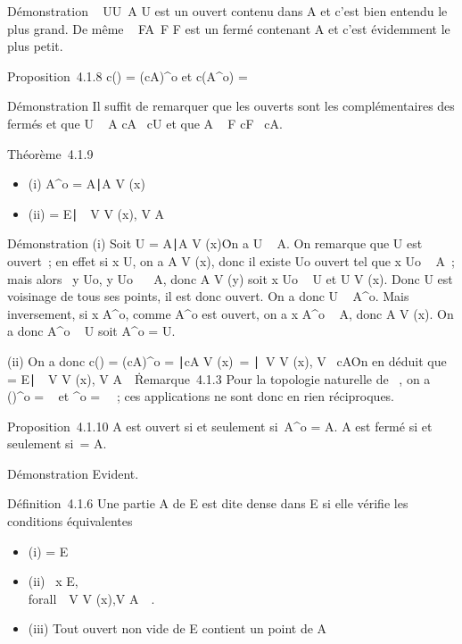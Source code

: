 Démonstration \⋃ ~
 U\textouvert \atop U\subset~A U
est un ouvert contenu dans A et c'est bien entendu le plus grand. De
même \⋂  ~
F \atop A\subset~F F est un
fermé contenant A et c'est évidemment le plus petit.

Proposition~4.1.8 c(\overlineA) = (cA)^o
et c(A^o) = \overlinecA

Démonstration Il suffit de remarquer que les ouverts sont les
complémentaires des fermés et que U \subset~ A \Leftrightarrow cA
\subset~cU et que A \subset~ F \Leftrightarrow cF \subset~cA.

Théorème~4.1.9

\begin{itemize}
\itemsep1pt\parskip0pt
\item
  (i) A^o = \x \in
  A∣A \in V (x)\
\item
  (ii) \overlineA = \x \in
  E∣\forall~~V \in V (x), V \bigcap
  A\neq~\varnothing~\
\end{itemize}

Démonstration (i) Soit U = \x \in
A∣A \in V (x)\. On a U \subset~ A. On
remarque que U est ouvert~; en effet si x \in U, on a A \in V (x), donc il
existe Uo ouvert tel que x \in Uo \subset~ A~; mais alors
\forall~y \in Uo, y \in Uo~ \subset~ A, donc
A \in V (y) soit x \in Uo \subset~ U et U \in V (x). Donc U est voisinage
de tous ses points, il est donc ouvert. On a donc U \subset~ A^o.
Mais inversement, si x \in A^o, comme A^o est
ouvert, on a x \in A^o \subset~ A, donc A \in V (x). On a donc
A^o \subset~ U soit A^o = U.

(ii) On a donc c(\overlineA) = (cA)^o =
\x∣cA \in V
(x)\ =
\x∣\exists~V
\in V (x), V \subset~cA\. On en déduit que
\overlineA = \x \in
E∣\forall~~V \in V (x), V \bigcap
A\neq~\varnothing~\.

Remarque~4.1.3 Pour la topologie naturelle de ~, on a
()^o = ~ et
\overlineℚ^o = \varnothing~~; ces applications ne
sont donc en rien réciproques.

Proposition~4.1.10 A est ouvert si et seulement si~A^o = A. A
est fermé si et seulement si~\overlineA = A.

Démonstration Evident.

Définition~4.1.6 Une partie A de E est dite dense dans E si elle vérifie
les conditions équivalentes

\begin{itemize}
\itemsep1pt\parskip0pt
\item
  (i) \overlineA = E
\item
  (ii) \forall~x \in E, \\forall~~V \in
  V (x),\quad V \bigcap A\neq~\varnothing~.
\item
  (iii) Tout ouvert non vide de E contient un point de A
\end{itemize}

